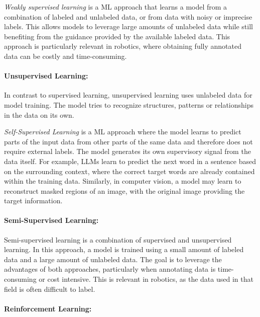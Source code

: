 \textit{Weakly supervised learning} is a \ac{ML} approach that learns a model from a combination of labeled and unlabeled data, or from data with noisy or imprecise labels. This allows models to leverage large amounts of unlabeled data while still benefiting from the guidance provided by the available labeled data. This approach is particularly relevant in robotics, where obtaining fully annotated data can be costly and time-consuming. 




\paragraph{Unsupervised Learning:}
In contrast to supervised learning, unsupervised learning uses unlabeled data for model training. The model tries to recognize structures, patterns or relationships in the data on its own. 

\textit{Self-Supervised Learning} is a \ac{ML} approach where the model learns to predict parts of the input data from other parts of the same data and therefore does not require external labels. The model generates its own supervisory signal from the data itself. For example, \acp{LLM} learn to predict the next word in a sentence based on the surrounding context, where the correct target words are already contained within the training data. Similarly, in computer vision, a model may learn to reconstruct masked regions of an image, with the original image providing the target information.


\paragraph{Semi-Supervised Learning:}
Semi-supervised learning is a combination of supervised and unsupervised learning. In this approach, a model is trained using a small amount of labeled data and a large amount of unlabeled data. The goal is to leverage the advantages of both approaches, particularly when annotating data is time-consuming or cost intensive. This is relevant in robotics, as the data used in that field is often difficult to label.


\paragraph{Reinforcement Learning:}

